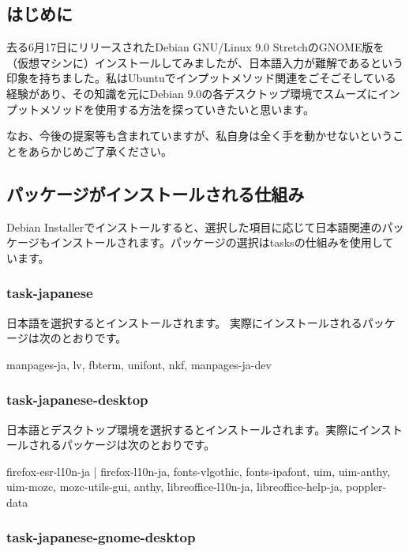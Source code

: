 \documentclass[mingoth,a4paper]{jsarticle}
\begin{document}
\subsection{はじめに}

去る6月17日にリリースされたDebian GNU/Linux 9.0 StretchのGNOME版を（仮想マシンに）インストールしてみましたが、日本語入力が難解であるという印象を持ちました。私はUbuntuでインプットメソッド関連をごそごそしている経験があり、その知識を元にDebian 9.0の各デスクトップ環境でスムーズにインプットメソッドを使用する方法を探っていきたいと思います。

なお、今後の提案等も含まれていますが、私自身は全く手を動かせないということをあらかじめご了承ください。

\subsection{パッケージがインストールされる仕組み}

Debian Installerでインストールすると、選択した項目に応じて日本語関連のパッケージもインストールされます。パッケージの選択はtasksの仕組みを使用しています。

\subsubsection{task-japanese}

日本語を選択するとインストールされます。
実際にインストールされるパッケージは次のとおりです。
\begin{commandline}
  manpages-ja, lv, fbterm, unifont, nkf, manpages-ja-dev
\end{commandline}

\subsubsection{task-japanese-desktop}

日本語とデスクトップ環境を選択するとインストールされます。実際にインストールされるパッケージは次のとおりです。
\begin{commandline}
  firefox-esr-l10n-ja | firefox-l10n-ja, fonts-vlgothic, fonts-ipafont,
  uim, uim-anthy, uim-mozc, mozc-utils-gui, anthy, libreoffice-l10n-ja, libreoffice-help-ja, poppler-data
\end{commandline}

\subsubsection{task-japanese-gnome-desktop}
\end{document}
